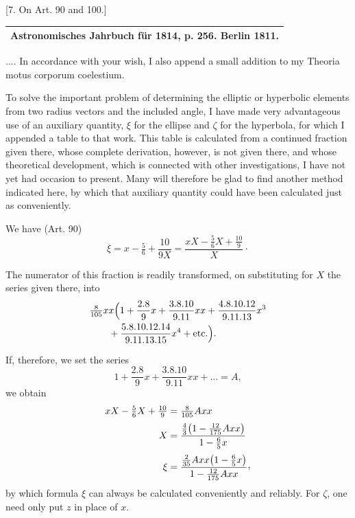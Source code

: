 \begin{center}
[7. On Art. 90 and 100.]
\end{center}
\begin{center}
\begin{tabular}{c}\hline
\small Astronomisches Jahrbuch für 1814, p. 256. Berlin 1811.\\\hline
\end{tabular}
\end{center}
.... In accordance with your wish, I also append a small addition to my Theoria motus corporum coelestium.

To solve the important problem of determining the elliptic or hyperbolic elements from two radius vectors and the included angle, I have made very advantageous use of an auxiliary quantity, \(\xi\) for the ellipse and \(\zeta\) for the hyperbola, for which I appended a table to that work. This table is calculated from a continued fraction given there, whose complete derivation, however, is not given there, and whose theoretical development, which is connected with other investigations, I have not yet had occasion to present. Many will therefore be glad to find another method indicated here, by which that auxiliary quantity could have been calculated just as conveniently.

We have (Art. 90)
\[
\xi=x-\tfrac56+\frac{10}{9X}=\frac{xX-\tfrac56X+\tfrac{10}{9}}{X}\mathpunct{\cdot}
\]

The numerator of this fraction is readily transformed, on substituting for \(X\) the series given there, into
\[
\begin{aligned}
&\tfrac8{105}xx\Bigl(1+\frac{2.8}{9}x+\frac{3.8.10}{9.11}xx+\frac{4.8.10.12}{9.11.13}x^3\\
&\qquad+\frac{5.8.10.12.14}{9.11.13.15}x^4+\text{etc.}\Bigr).
\end{aligned}
\]

If, therefore, we set the series
\[
1+\frac{2.8}{9}x+\frac{3.8.10}{9.11}xx+\ldots=A,
\]
we obtain
\[
\begin{aligned}
xX-\tfrac56X+\tfrac{10}{9}&=\tfrac8{105}Axx\\[.5ex]
X&=\frac{\tfrac43\bigl(1-\tfrac{12}{175}Axx\bigr)}{1-\tfrac65x}\\[.5ex]
\xi&=\frac{\tfrac2{35}Axx\bigl(1-\tfrac65x\bigr)}{1-\tfrac{12}{175}Axx}\mathpunct{\raisebox{.45ex}{,}}
\end{aligned}
\]
by which formula \(\xi\) can always be calculated conveniently and reliably. For \(\zeta\), one need only put \(z\) in place of \(x\).

